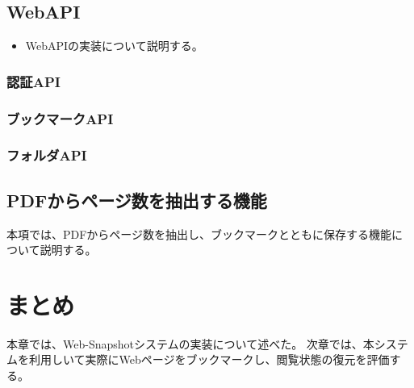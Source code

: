 \subsection{WebAPI}
\begin{itemize}
  \item WebAPIの実装について説明する。
\end{itemize}

\subsubsection{認証API}
\subsubsection{ブックマークAPI}


\subsubsection{フォルダAPI}

\subsection{PDFからページ数を抽出する機能}
本項では、PDFからページ数を抽出し、ブックマークとともに保存する機能について説明する。



\section{まとめ}
本章では、Web-Snapshotシステムの実装について述べた。
次章では、本システムを利用しいて実際にWebページをブックマークし、閲覧状態の復元を評価する。